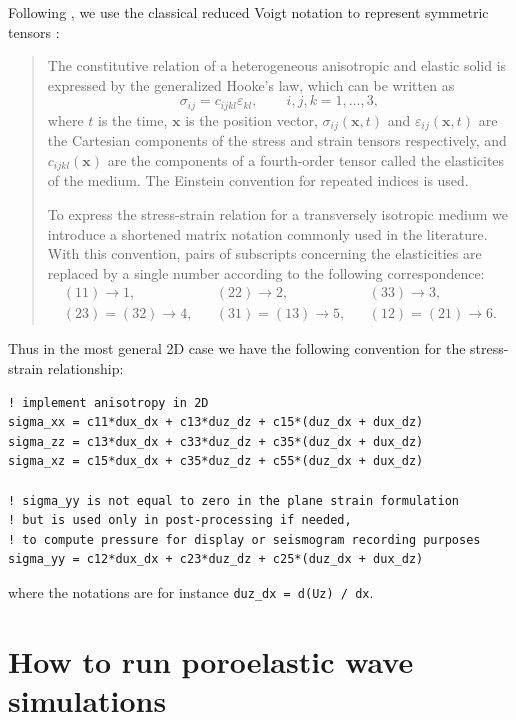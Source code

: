 Following \cite{CaKoKo88}, we use the classical reduced Voigt notation to represent symmetric
tensors \citep{Hel94,Car07}:
%
\begin{quotation}
The constitutive relation of a heterogeneous anisotropic and elastic solid
is expressed by the generalized Hooke's law, which can be written as
%
\begin{equation*}
\sigma_{ij} = c_{ijkl} \varepsilon_{kl}, \qquad i, j, k = 1, \dots, 3,
\end{equation*}
%
where $t$ is the time, $\mathbf{x}$ is the position vector, $\sigma_{ij}(\mathbf{x}, t)$ and $\varepsilon_{ij}(\mathbf{x}, t)$ are the
Cartesian components of the stress and strain tensors respectively, and
$c_{ijkl}(\mathbf{x})$ are the components of a fourth-order tensor called the elasticites of
the medium. The Einstein convention for repeated indices is used.

To express the stress-strain relation for a transversely isotropic medium
we introduce a shortened matrix notation commonly used in the literature.
With this convention, pairs of subscripts concerning the elasticities are
replaced by a single number according to the following correspondence:
%
\begin{align*}
(11) \rightarrow 1, &&
(22) \rightarrow 2, &&
(33) \rightarrow 3, \\
(23) = (32) \rightarrow 4, &&
(31) = (13) \rightarrow 5, &&
(12) = (21) \rightarrow 6.
\end{align*}
\end{quotation}
%
Thus in the most general 2D case we have the following convention for the stress-strain relationship:
%
\begin{verbatim}
! implement anisotropy in 2D
sigma_xx = c11*dux_dx + c13*duz_dz + c15*(duz_dx + dux_dz)
sigma_zz = c13*dux_dx + c33*duz_dz + c35*(duz_dx + dux_dz)
sigma_xz = c15*dux_dx + c35*duz_dz + c55*(duz_dx + dux_dz)

! sigma_yy is not equal to zero in the plane strain formulation
! but is used only in post-processing if needed,
! to compute pressure for display or seismogram recording purposes
sigma_yy = c12*dux_dx + c23*duz_dz + c25*(duz_dx + dux_dz)
\end{verbatim}
%
where the notations are for instance \texttt{duz\_dx = d(Uz) / dx}.


\section{How to run poroelastic wave simulations}

